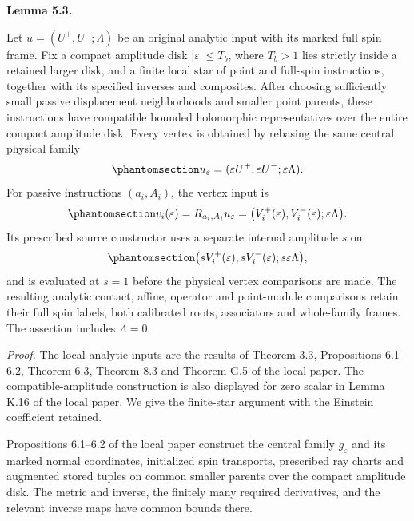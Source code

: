 \documentclass[
  english,
  11pt,
  reqno]{amsart}
\makeatletter
\newcommand{\pandocstatementheading}[1]{%
  \par\addpenalty{\@beginparpenalty}%
  \addvspace{.5\baselineskip plus .2\baselineskip minus .2\baselineskip}%
  {\normalfont\bfseries #1\par}%
  \nobreak\@afterindenttrue\@afterheading
}
\makeatother
\begin{document}
\pandocstatementheading{\protect{}\label{lem:compatible-source-amplitude-diagrams}Lemma 5.3.}

Let \(u=(U^+,U^-;\Lambda)\) be an original analytic input with its
marked full spin frame. Fix a compact amplitude disk
\(|\varepsilon|\le T_b\), where \(T_b>1\) lies strictly inside a
retained larger disk, and a finite local star of point and full-spin
instructions, together with its specified inverses and composites. After
choosing sufficiently small passive displacement neighborhoods and
smaller point parents, these instructions have compatible bounded
holomorphic representatives over the entire compact amplitude disk.
Every vertex is obtained by rebasing the same central physical family
\begin{equation}\protect\phantomsection\label{eq:source-compatible-central-amplitude}{
u_\varepsilon
=(\varepsilon U^+,\varepsilon U^-;\varepsilon\Lambda).
}\end{equation} For passive instructions \((a_i,A_i)\), the vertex input
is
\begin{equation}\protect\phantomsection\label{eq:source-compatible-vertex-input}{
v_i(\varepsilon)=R_{a_i,A_i}u_\varepsilon
=\bigl(V_i^+(\varepsilon),V_i^-(\varepsilon);
       \varepsilon\Lambda\bigr).
}\end{equation} Its prescribed source constructor uses a separate
internal amplitude \(s\) on
\begin{equation}\protect\phantomsection\label{eq:source-independent-internal-amplitude}{
\bigl(sV_i^+(\varepsilon),sV_i^-(\varepsilon);
      s\varepsilon\Lambda\bigr),
}\end{equation} and is evaluated at \(s=1\) before the physical vertex
comparisons are made. The resulting analytic contact, affine, operator
and point-module comparisons retain their full spin labels, both
calibrated roots, associators and whole-family frames. The assertion
includes \(\Lambda=0\).

\emph{Proof.} The local analytic inputs are the results of Theorem 3.3,
Propositions 6.1--6.2, Theorem 6.3, Theorem 8.3 and Theorem G.5 of the
local paper. The compatible-amplitude construction is also displayed for
zero scalar in Lemma K.16 of the local paper. We give the finite-star
argument with the Einstein coefficient retained.

Propositions 6.1--6.2 of the local paper construct the central family
\(g_\varepsilon\) and its marked normal coordinates, initialized spin
transports, prescribed ray charts and augmented stored tuples on common
smaller parents over the compact amplitude disk. The metric and inverse,
the finitely many required derivatives, and the relevant inverse maps
have common bounds there.
\end{document}
